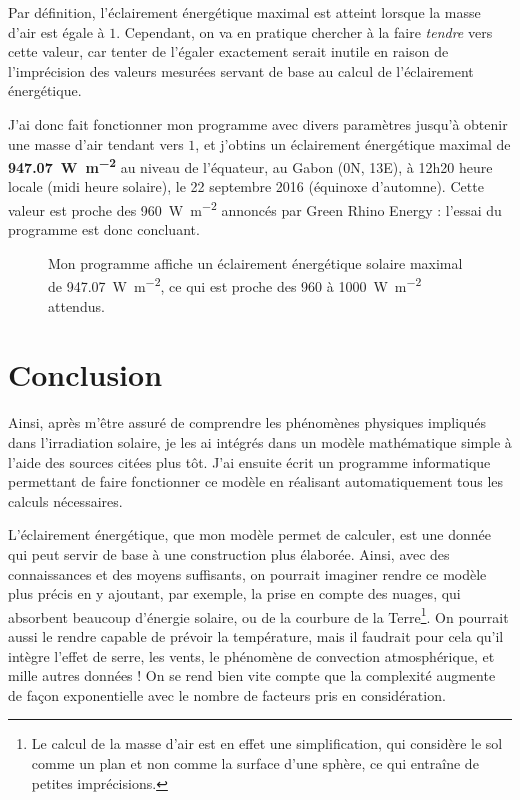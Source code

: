 \documentclass[12pt]{article}
\begin{document}
Par définition, l'éclairement énergétique maximal est atteint lorsque la masse d'air est égale à $1$.
Cependant, on va en pratique chercher à la faire \emph{tendre} vers cette valeur, car tenter de l'égaler exactement serait inutile en raison de l'imprécision des valeurs mesurées servant de base au calcul de l'éclairement énergétique.

J'ai donc fait fonctionner mon programme avec divers paramètres jusqu'à obtenir une masse d'air tendant vers $1$, et j'obtins un éclairement énergétique maximal de \textbf{\SI{947.07}{\watt\per\square\meter}} au niveau de l'équateur, au Gabon (0\degree N, 13\degree E), à 12h20 heure locale (midi heure solaire), le 22 septembre 2016 (équinoxe d'automne).
Cette valeur est proche des \SI{960}{\watt\per\square\meter} annoncés par Green Rhino Energy : l'essai du programme est donc concluant.

\begin{figure}[!ht]
  \centering
  \caption{Mon programme affiche un éclairement énergétique solaire maximal de \SI{947.07}{\watt\per\square\meter}, ce qui est proche des 960 à \SI{1000}{\watt\per\square\meter} attendus.}
  \label{fig:maximum}
\end{figure}


\FloatBarrier
\section{Conclusion}

Ainsi, après m'être assuré de comprendre les phénomènes physiques impliqués dans l'irradiation solaire, je les ai intégrés dans un modèle mathématique simple à l'aide des sources citées plus tôt. J'ai ensuite écrit un programme informatique permettant de faire fonctionner ce modèle en réalisant automatiquement tous les calculs nécessaires.

L'éclairement énergétique, que mon modèle permet de calculer, est une donnée qui peut servir de base à une construction plus élaborée.
Ainsi, avec des connaissances et des moyens suffisants, on pourrait imaginer rendre ce modèle plus précis en y ajoutant, par exemple, la prise en compte des nuages, qui absorbent beaucoup d'énergie solaire, ou de la courbure de la Terre\footnote{Le calcul de la masse d'air est en effet une simplification, qui considère le sol comme un plan et non comme la surface d'une sphère, ce qui entraîne de petites imprécisions.}.
On pourrait aussi le rendre capable de prévoir la température, mais il faudrait pour cela qu'il intègre l'effet de serre, les vents, le phénomène de convection atmosphérique, et mille autres données !
On se rend bien vite compte que la complexité augmente de façon exponentielle avec le nombre de facteurs pris en considération.
\end{document}
